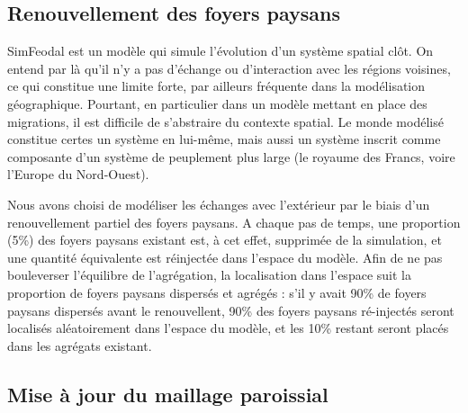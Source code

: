 \subsection{Renouvellement des foyers paysans \label{meca-renouvellement}}

SimFeodal est un modèle qui simule l'évolution d'un système spatial clôt.
On entend par là qu'il n'y a pas d'échange ou d'interaction avec les régions voisines, ce qui constitue une limite forte, par ailleurs fréquente dans la modélisation géographique.
Pourtant, en particulier dans un modèle mettant en place des migrations, il est difficile de s'abstraire du contexte spatial.
Le monde modélisé constitue certes un système en lui-même, mais aussi un système inscrit comme composante d'un système de peuplement plus large (le royaume des Francs, voire l'Europe du Nord-Ouest).

\begin{tcolorbox}[breakable,left=0pt,right=0pt,top=0pt,bottom=0pt,
	colback=gray!15,colframe=gray!15,width=\dimexpr\textwidth\relax, 
	enlarge left by=0mm, boxsep=5pt,arc=0pt,outer arc=0pt]
Nous avons choisi de modéliser les échanges avec l'extérieur par le biais d'un renouvellement partiel des foyers paysans.
A chaque pas de temps, une proportion (5\%) des foyers paysans existant est, à cet effet, supprimée de la simulation, et une quantité équivalente est réinjectée dans l'espace du modèle.
Afin de ne pas bouleverser l'équilibre de l'agrégation, la localisation dans l'espace suit la proportion de foyers paysans dispersés et agrégés :
s'il y avait 90\% de foyers paysans dispersés avant le renouvellent, 90\% des foyers paysans ré-injectés seront localisés aléatoirement dans l'espace du modèle, et les 10\% restant seront placés dans les agrégats existant\footnotemark.
\end{tcolorbox}

\subsection{Mise à jour du maillage paroissial \label{meca-paroisses}}

